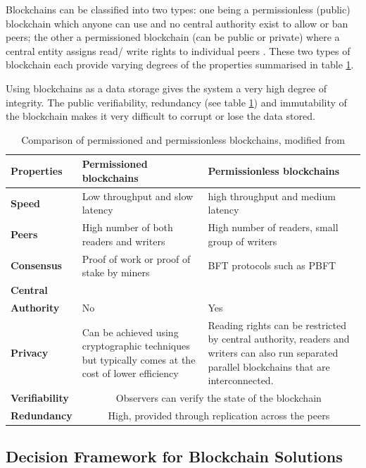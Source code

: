 Blockchains can be classified into two types: one being a permissionless (public) blockchain which anyone can 
use and no central authority exist to allow or ban peers; the other a permissioned blockchain (can be public or private)
where a central entity assigns read/ write rights to individual peers \citep[p.1]{wust2017you}. These two types of 
blockchain each provide varying degrees of the properties summarised in table \ref{table:permvsless}.

Using blockchains as a data storage gives the system a very high degree of integrity. The public verifiability, 
redundancy (see table \ref{table:permvsless}) and immutability of the blockchain makes it very difficult to 
corrupt or lose the data stored.

\begin{table}[!ht] 
    \caption{Comparison of permissioned and permissionless blockchains, modified from \citet[p.3]{wust2017you}}
    \centering
    \label{table:permvsless}
    \begin{tabularx}{\textwidth}{>{\bfseries}lXX}
        Properties & Permissioned blockchains & Permissionless blockchains\\
        \toprule
        Speed & Low throughput and slow latency & high throughput and medium latency\\\midrule
        Peers & High number of both readers and writers & High number of readers, small group of writers\\\midrule
        Consensus & Proof of work or proof of stake by miners & BFT protocols such as PBFT\\\midrule
        Central\\Authority & No & Yes\\\midrule
        Privacy & Can be achieved using cryptographic techniques but typically comes at the cost of lower efficiency & 
        Reading rights can be restricted by central authority, readers and writers can also run separated parallel blockchains that are interconnected. \\\midrule
        Verifiability & \multicolumn{2}{c}{Observers can verify the state of the blockchain} \\\midrule
        Redundancy & \multicolumn{2}{c}{High, provided through replication across the peers}
        \\\bottomrule
    \end{tabularx}
\end{table}

\subsection{Decision Framework for Blockchain Solutions}

